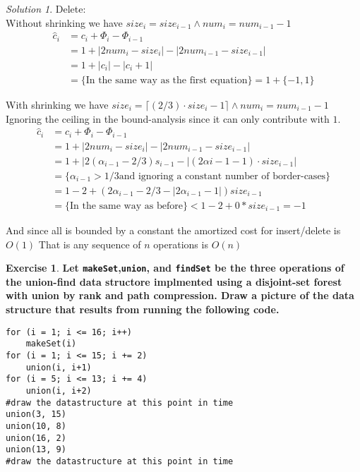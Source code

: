 \documentclass[a4paper,twoside=false,abstract=false,numbers=noenddot,
titlepage=false,headings=small,parskip=half,version=last]{scrartcl}
\theoremstyle{definition}
\newtheorem{exercise}{Exercise}
\theoremstyle{remark}
\newtheorem*{solution}{Solution}
\begin{document}
\begin{solution}
Delete:\\


Without shrinking we have $size_i=size_{i-1} \wedge num_i=num_{i-1}-1$\\
\begin{equation}
\begin{split}
    \hat{c}_i & = c_i + \Phi_i - \Phi_{i-1} \\
              & = 1 + |2num_i-size_i|-|2num_{i-1}-size_{i-1}| \\
              & = 1 + |c_i|-|c_i+1| \\
              & = \{\mbox{In the same way as the first equation}\} = 1 + \{-1,1\}
\end{split}
\end{equation}

With shrinking we have $size_i=\lceil (2/3)\cdot size_i-1\rceil \wedge num_i=num_{i-1}-1$\\
Ignoring the ceiling in the bound-analysis since it can only contribute with
$1$.\\

\begin{equation}
\begin{split}
    \hat{c}_i & = c_i + \Phi_i - \Phi_{i-1} \\
              & = 1 + |2num_i-size_i|-|2num_{i-1}-size_{i-1}| \\
              & = 1 + |2(\alpha_{i-1}-2/3)s_{i-1}-|(2\alpha{i-1}-1)\cdot
              size_{i-1}| \\
              & = \{\alpha_{i-1}>1/3 \mbox{and ignoring a constant number of
              border-cases}\} \\
              & = 1-2+ (2\alpha_{i-1}-2/3-|2\alpha_{i-1}-1|)size_{i-1} \\
              & = \{\mbox{In the same way as before}\} < 1-2 + 0*size_{i-1} = -1
\end{split}
\end{equation}

And since all is bounded by a constant the amortized cost for insert/delete is $O(1)$
That is any sequence of $n$ operations is $O(n)$

\end{solution}
\begin{exercise}
{\bf
Let \verb+makeSet+,\verb+union+, and \verb+findSet+ be the three operations of the union-find data structore implmented using a disjoint-set forest with union by rank and path compression.
Draw a picture of the data structure that results from running the following code. 
\begin{verbatim}
for (i = 1; i <= 16; i++)
    makeSet(i)
for (i = 1; i <= 15; i += 2)
    union(i, i+1)
for (i = 5; i <= 13; i += 4)
    union(i, i+2)
#draw the datastructure at this point in time
union(3, 15)
union(10, 8)
union(16, 2)
union(13, 9)
#draw the datastructure at this point in time
\end{verbatim}
}
\end{exercise}
\end{document}
